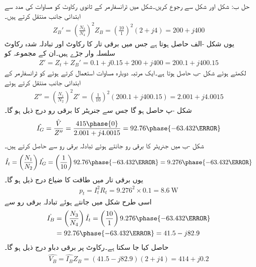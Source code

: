 حل ب:\quad
شکل  اور شکل   سے رجوع کریں۔شکل   میں ٹرانسفارمر  کے ثانوی  رکاوٹ کو مساوات   کی مدد سے  ابتدائی جانب منتقل کرتے ہیں۔
\begin{align*}
Z_B'=\left(\frac{N_3}{N_4} \right)^2 Z_B=\left(\frac{10}{1} \right)^2 \left(2+j 4 \right)=200+j 400
\end{align*}
یوں شکل -الف حاصل ہوتا ہے جس  میں  برقی تار کا رکاوٹ اور  تبادلہ شدہ رکاوٹ سلسلہ وار جڑے ہیں۔ان کے مجموعہ  کو  
\begin{align*}
Z'=Z_t+Z_B'=0.1+j 0.15+200+j 400=200.1+j400.15
\end{align*}
لکھتے ہوئے شکل -ب حاصل ہوتا ہے۔ایک مرتبہ دوبارہ مساوات   استعمال کرتے ہوئے  کو ٹرانسفارمر کے ابتدائی جانب منتقل کرتے ہوئے
\begin{align*}
Z''=\left(\frac{N_1}{N_2} \right)^2 Z'=\left(\frac{1}{10} \right)^2 \left(200.1+j400.15 \right)=2.001+j4.0015
\end{align*}
شکل -پ حاصل ہو گا جس سے جنریٹر کا برقی رو درج ذیل ہو گا۔
\begin{align*}
\hat{I_G}=\frac{\hat{V}}{Z''}=\frac{415\phase{0}}{2.001+j4.0015}=92.76\phase{-63.432\degree}
\end{align*}
شکل -ب  میں جنریٹر کا برقی رو جانتے ہوئے  تبادلہ برقی رو سے  حاصل کرتے ہیں۔
\begin{align*}
\hat{I_t}=\left(\frac{N_1}{N_2} \right) \hat{I_G}=\left(\frac{1}{10}\right) 92.76\phase{-63.432\degree}=9.276\phase{-63.432\degree}
\end{align*}
یوں برقی تار میں طاقت کا ضیاع درج ذیل ہو گا۔
\begin{align*}
p_t=I_t^2 R_t=9.276^2  \times 0.1=\SI{8.6}{\watt}
\end{align*}
اسی طرح شکل   میں   جانتے ہوئے تبادلہ برقی رو سے
\begin{align*}
\hat{I_B}&=\left(\frac{N_3}{N_4}\right) \hat{I_t}=\left(\frac{10}{1}\right) 9.276\phase{-63.432\degree}\\
&=92.76\phase{-63.432\degree}=41.5-j 82.9
\end{align*}
حاصل کیا جا سکتا ہے۔رکاوٹ پر برقی دباو درج ذیل ہو گا۔
\begin{align*}
\hat{V_B}=\hat{I_B} Z_B=\left(41.5-j 82.9 \right) \left(2+j 4 \right)=414+j 0.2
\end{align*}
